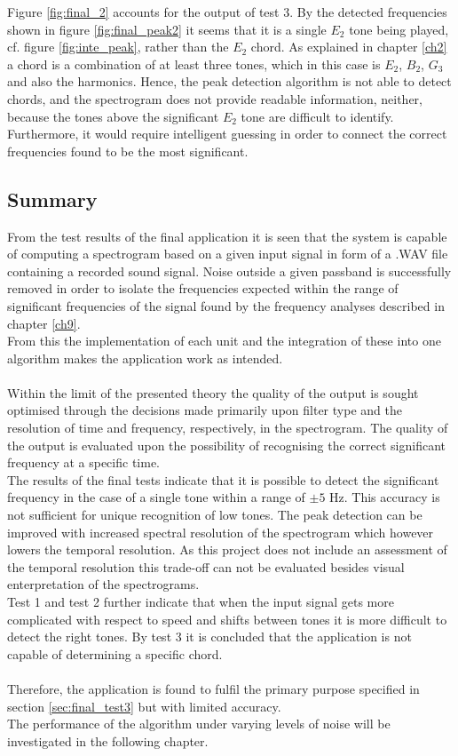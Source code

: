 Figure \ref{fig:final_2} accounts for the output of test 3. By the detected frequencies shown in figure \ref{fig:final_peak2} it seems that it is a single $E_2$ tone being played, cf. figure \ref{fig:inte_peak}, rather than the $E_2$ chord. As explained in chapter \ref{ch2} a chord is a combination of at least three tones, which in this case is $E_2$, $B_2$, $G_3$\hashsharp and also the harmonics. Hence, the peak detection algorithm is not able to detect chords, and the spectrogram does not provide readable information, neither, because the tones above the significant $E_2$ tone are difficult to identify. Furthermore, it would require intelligent guessing in order to connect the correct frequencies found to be the most significant.

\subsection{Summary}
From the test results of the final application it is seen that the system is capable of computing a spectrogram based on a given input signal in form of a .WAV file containing a recorded sound signal. Noise outside a given passband is successfully removed in order to isolate the frequencies expected within the range of significant frequencies of the signal found by the frequency analyses described in chapter \ref{ch9}. \\
From this the implementation of each unit and the integration of these into one algorithm makes the application work as intended. \\
\\
Within the limit of the presented theory the quality of the output is sought optimised through the decisions made primarily upon filter type and the resolution of time and frequency, respectively, in the spectrogram.
The quality of the output is evaluated upon the possibility of recognising the correct significant frequency at a specific time. \\
The results of the final tests indicate that it is possible to detect the significant frequency in the case of a single tone within a range of $\pm 5$ Hz. This accuracy is not sufficient for unique recognition of low tones. The peak detection can be improved with increased spectral resolution of the spectrogram which however lowers the temporal resolution. As this project does not include an assessment of the temporal resolution this trade-off can not be evaluated besides visual enterpretation of the spectrograms.\\        
Test 1 and test 2 further indicate that when the input signal gets more complicated with respect to speed and shifts between tones it is more difficult to detect the right tones. By test 3 it is concluded that the application is not capable of determining a specific chord. \\   
\\
Therefore, the application is found to fulfil the primary purpose specified in section \ref{sec:final_test3} but with limited accuracy.\\
The performance of the algorithm under varying levels of noise will be investigated in the following chapter.